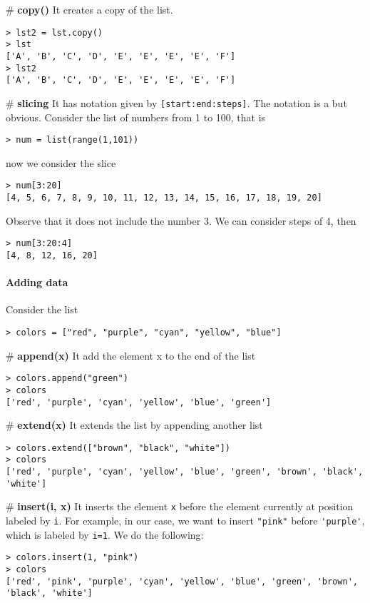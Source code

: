 \# {\bf copy()} It creates a copy of the list. 
\begin{verbatim}
> lst2 = lst.copy()
> lst
['A', 'B', 'C', 'D', 'E', 'E', 'E', 'E', 'F']   
> lst2 
['A', 'B', 'C', 'D', 'E', 'E', 'E', 'E', 'F']
\end{verbatim}

\# {\bf slicing} It has notation given by \verb|[start:end:steps]|. The notation is a but obvious. Consider the list of numbers from 1 to 100, that is 
\begin{verbatim}
> num = list(range(1,101))
\end{verbatim}
now we consider the slice
\begin{verbatim}
> num[3:20]
[4, 5, 6, 7, 8, 9, 10, 11, 12, 13, 14, 15, 16, 17, 18, 19, 20]
\end{verbatim}
Observe that it does not include the number 3. We can consider steps of 4, then
\begin{verbatim}    
> num[3:20:4]
[4, 8, 12, 16, 20]
\end{verbatim}

\paragraph{Adding data}

Consider the list
\begin{verbatim}
> colors = ["red", "purple", "cyan", "yellow", "blue"]
\end{verbatim}

\# {\bf append(x)} It add the element x to the end of the list 
\begin{verbatim}
> colors.append("green")
> colors
['red', 'purple', 'cyan', 'yellow', 'blue', 'green']
\end{verbatim}

\# {\bf extend(x)} It extends the list by appending another list 
\begin{verbatim}
> colors.extend(["brown", "black", "white"])       
> colors
['red', 'purple', 'cyan', 'yellow', 'blue', 'green', 'brown', 'black', 'white']
\end{verbatim}        
        
\# {\bf insert(i, x)} It inserts the element \verb|x| before the element currently at position labeled by \verb|i|. For example, in our case, we want to insert \verb|"pink"| before \verb|'purple'|, which is labeled by \verb|i=1|. We do the following:
\begin{verbatim}
> colors.insert(1, "pink")       
> colors
['red', 'pink', 'purple', 'cyan', 'yellow', 'blue', 'green', 'brown', 'black', 'white']
\end{verbatim}        

